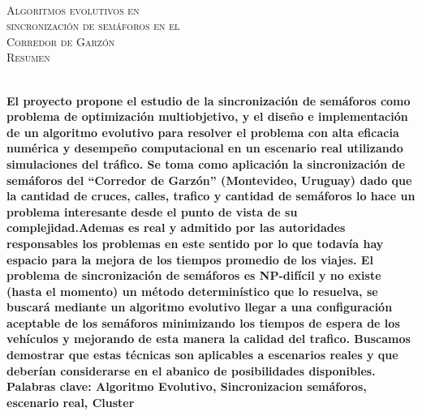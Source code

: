 {
\thispagestyle{empty}
~\\[0.2cm]
\begin{center}
    \textsc{\huge Algoritmos evolutivos en  } \\[0.2cm] 
    \textsc{\huge sincronización de semáforos en el  } \\[0.2cm]         
    \textsc{\huge Corredor de Garzón} \\[1cm]
    \textsc{\Large Resumen}
\end{center}
~\\[0.2cm]
\textbf{\large 
El proyecto propone el estudio de la sincronización de semáforos como problema de optimización multiobjetivo, y el diseño e implementación de un algoritmo evolutivo para resolver el problema con alta eficacia numérica y desempeño computacional en un escenario real utilizando simulaciones del tráfico. \newline \newline
Se toma como aplicación la sincronización de semáforos del “Corredor de Garzón” (Montevideo, Uruguay) dado que la cantidad de cruces, calles, trafico y cantidad de semáforos lo hace un problema interesante desde el punto de vista de su complejidad.Ademas es real y admitido por las autoridades responsables los problemas en este sentido por lo que todavía hay espacio para la mejora de los tiempos promedio de los viajes.  \newline \newline
El problema de sincronización de semáforos es NP-difícil y no existe (hasta el momento) un método determinístico que lo resuelva, se buscará mediante un algoritmo evolutivo llegar a una configuración aceptable de los semáforos minimizando los tiempos de espera de los vehículos y mejorando de esta manera la calidad del trafico.
Buscamos demostrar que estas técnicas son aplicables a escenarios reales y que deberían considerarse en el abanico de posibilidades disponibles. } 	
	~\\[1.0cm]
    \textbf{\large Palabras clave: Algoritmo Evolutivo, Sincronizacion semáforos, escenario real, Cluster}

}
\cleardoublepage
